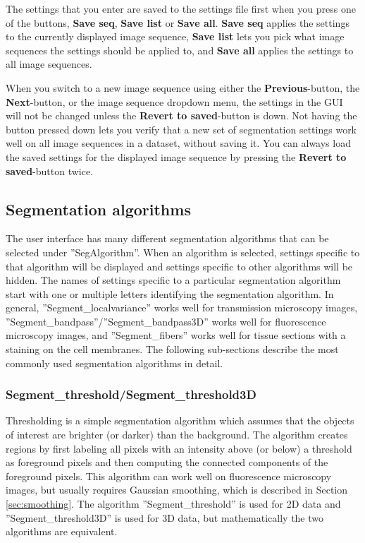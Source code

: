 \documentclass[a4paper, oneside, onecolumn, 11pt]{article}
\newcommand{\setting}[1]{''#1''}
\newcommand{\control}[1]{\textbf{#1}}
\begin{document}
The settings that you enter are saved to the settings file first when you press one of the buttons, \control{Save seq}, \control{Save list} or \control{Save all}. \control{Save seq} applies the settings to the currently displayed image sequence, \control{Save list} lets you pick what image sequences the settings should be applied to, and \control{Save all} applies the settings to all image sequences.

When you switch to a new image sequence using either the \control{Previous}-button, the \control{Next}-button, or the image sequence dropdown menu, the settings in the GUI will not be changed unless the \control{Revert to saved}-button is down. Not having the button pressed down lets you verify that a new set of segmentation settings work well on all image sequences in a dataset, without saving it. You can always load the saved settings for the displayed image sequence by pressing the \control{Revert to saved}-button twice.

\subsection{Segmentation algorithms}
\label{sec:segmentation-algorithms}
The user interface has many different segmentation algorithms that can be selected under \setting{SegAlgorithm}. When an algorithm is selected, settings specific to that algorithm will be displayed and settings specific to other algorithms will be hidden. The names of settings specific to a particular segmentation algorithm start with one or multiple letters identifying the segmentation algorithm. In general, \setting{Segment\_localvariance} works well for transmission microscopy images, \setting{Segment\_bandpass}/\setting{Segment\_bandpass3D} works well for fluorescence microscopy images, and \setting{Segment\_fibers} works well for tissue sections with a staining on the cell membranes. The following sub-sections describe the most commonly used segmentation algorithms in detail.

\subsubsection{Segment\_threshold/Segment\_threshold3D}
Thresholding is a simple segmentation algorithm which assumes that the objects of interest are brighter (or darker) than the background. The algorithm creates regions by first labeling all pixels with an intensity above (or below) a threshold as foreground pixels and then computing the connected components of the foreground pixels. This algorithm can work well on fluorescence microscopy images, but usually requires Gaussian smoothing, which is described in Section \ref{sec:smoothing}. The algorithm \setting{Segment\_threshold} is used for 2D data and \setting{Segment\_threshold3D} is used for 3D data, but mathematically the two algorithms are equivalent.
\end{document}
